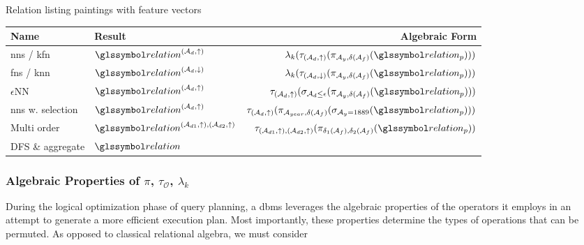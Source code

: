 \begin{example}[label=example:rel_painting_w_features]{Relation listing paintings with feature vectors}{}
    \begin{center}
        \begin{tabular}{||l l r ||} 
         \hline
         Name & Result & Algebraic Form \\
         \hline\hline
         \acrshort{nns} / \acrshort{kfn} & $\relation^{(\mathcal{A}_d,\uparrow)}$ & $\lambda_k (\tau_{(\mathcal{A}_d,\uparrow)} ( \pi_{\mathcal{A}_{y}, \delta(\mathcal{A}_{f})}  ( \relation_p)))$  \\ 
         \hline
         \acrshort{fns} / \acrshort{knn}& $\relation^{(\mathcal{A}_d,\downarrow)}$ & $\lambda_k (\tau_{(\mathcal{A}_d,\downarrow)} ( \pi_{\mathcal{A}_{y}, \delta(\mathcal{A}_{f})}  ( \relation_p)))$   \\
         \hline
         $\epsilon$NN & $\relation^{(\mathcal{A}_d,\uparrow)}$ & $\tau_{(\mathcal{A}_d,\uparrow)} ( \sigma_{\mathcal{A}_d \leq \epsilon} ( \pi_{\mathcal{A}_{y}, \delta(\mathcal{A}_{f})} ( \relation_p)) )$  \\
         \hline
         \acrshort{nns} w. selection & $\relation^{(\mathcal{A}_d,\uparrow)}$ &  $\tau_{(\mathcal{A}_d,\uparrow)} ( \pi_{\mathcal{A}_{year}, \delta(\mathcal{A}_{f})} ( \sigma_{\mathcal{A}_{y} = 1889} ( \relation_p)) )$\\
         \hline
         Multi order & $\relation^{(\mathcal{A}_{d1},\uparrow),(\mathcal{A}_{d2},\uparrow)}$ & $\tau_{(\mathcal{A}_{d1},\uparrow),(\mathcal{A}_{d2},\uparrow)} ( \pi_{\delta_1(\mathcal{A}_{f}), \delta_2(\mathcal{A}_{f})}  ( \relation_p))$ \\ 
         \hline
         DFS \& aggregate & $\relation$ & \\ 
         \hline
        \end{tabular}
    \end{center}

\end{example}

\subsubsection{Algebraic Properties of $\pi$, $\tau_{\mathcal{O}}$, $\lambda_k$}

During the logical optimization phase of query planning, a \acrshort{dbms} leverages the algebraic properties of the operators it employs in an attempt to generate a more efficient execution plan. Most importantly, these properties determine the types of operations that can be permuted. As opposed to classical relational algebra, we must consider  

